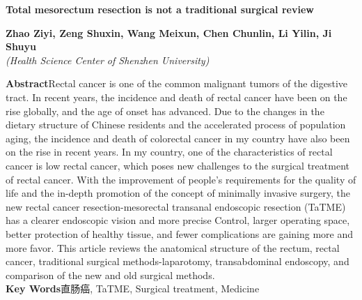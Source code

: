 \documentclass[a4paper,11pt,onecolumn,twoside]{article}
\begin{document}
\vspace{.1cm}
\begin{center}
    \parbox{\textwidth}{
    \begin{center}
        {\large{\textbf{Total mesorectum resection is not a traditional surgical review}}}\\[4pt]
        \vspace{-0.5cm}\end{center}
    \begin{center}
        \textbf{Zhao Ziyi, Zeng Shuxin, Wang Meixun, Chen Chunlin, Li Yilin, Ji Shuyu}\\[2pt]
        \small{\textit{(Health Science Center of Shenzhen University)}}\\[2pt]
    \end{center}
    {\small{\textbf{Abstract}\quad Rectal cancer is one of the common malignant tumors of the digestive tract. In recent years, the incidence and death of rectal cancer have been on the rise globally, and the age of onset has advanced. Due to the changes in the dietary structure of Chinese residents and the accelerated process of population aging, the incidence and death of colorectal cancer in my country have also been on the rise in recent years. In my country, one of the characteristics of rectal cancer is low rectal cancer, which poses new challenges to the surgical treatment of rectal cancer. With the improvement of people’s requirements for the quality of life and the in-depth promotion of the concept of minimally invasive surgery, the new rectal cancer resection-mesorectal transanal endoscopic resection (TaTME) has a clearer endoscopic vision and more precise Control, larger operating space, better protection of healthy tissue, and fewer complications are gaining more and more favor. This article reviews the anatomical structure of the rectum, rectal cancer, traditional surgical methods-laparotomy, transabdominal endoscopy, and comparison of the new and old surgical methods.
        \\
        \textbf{Key Words}\quad 直肠癌, TaTME, Surgical treatment, Medicine}}
    }
\end{center}

\setlength{\oddsidemargin}{-.5cm}
\setlength{\evensidemargin}{\oddsidemargin}
\setlength{\textwidth}{17.00cm}
\end{document}
